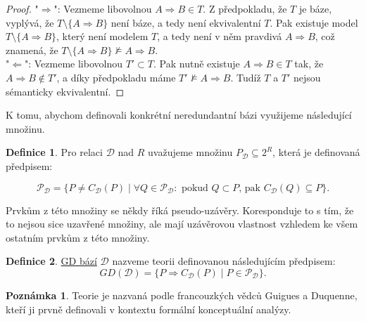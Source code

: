 \documentclass{article}
\theoremstyle {definition}
\newtheorem{definition}{Definice}
\newtheorem*{remark}{Poznámka}
\begin{document}
\begin{proof}
  "$\Rightarrow$": Vezmeme libovolnou $A \Rightarrow B \in T$. Z
  předpokladu, že $T$ je báze, vyplývá, že $T \setminus \{A
  \Rightarrow B \}$ není báze, a tedy není ekvivalentní $T$. Pak
  existuje model $T \setminus \{A \Rightarrow B \}$, který není
  modelem $T$, a tedy není v něm pravdivá $A\Rightarrow B$, což
  znamená, že $T \setminus \{A \Rightarrow B \} \not\models A
  \Rightarrow B$.\\
  
  "$\Leftarrow$": Vezmeme libovolnou $T' \subset T$. Pak nutně
  existuje $A \Rightarrow B \in T$ tak, že $A \Rightarrow B \notin
  T'$, a díky předpokladu máme $T' \not\models A \Rightarrow B$. Tudíž
  $T$ a $T'$ nejsou sémanticky ekvivalentní.
\end{proof}

K tomu, abychom definovali konkrétní neredundantní bázi využijeme
následující množinu.

\begin{definition}
  Pro relaci $\mathcal{D}$ nad $R$ uvažujeme množinu $P_{\mathcal{D}}
  \subseteq 2^R$, která je definovaná předpisem:
  
  $$ \mathcal P_{\mathcal{D}} = \{ P \neq C_{\mathcal{D}}(P) \mid
  \forall Q \in \mathcal P_{\mathcal{D}}: \text{ pokud } Q \subset P
  \text{, pak } C_{\mathcal{D}}(Q) \subseteq P \}. $$
\end{definition}

Prvkům z této množiny se někdy říká pseudo-uzávěry. Koresponduje to s
tím, že to nejsou sice uzavřené množiny, ale mají uzávěrovou vlastnost
vzhledem ke všem ostatním prvkům z této množiny.

\begin {definition}
  \underline {GD bází} $\mathcal D$ nazveme teorii definovanou
  následujícím předpisem:
  $$GD(\mathcal D)= \{P \Rightarrow C_{\mathcal{D}}(P) \mid P \in
  \mathcal P_{\mathcal{D}}\}.$$
\end {definition}

\begin {remark}
  Teorie je nazvaná podle francouzkých vědců Guigues a Duquenne, kteří
  ji prvně definovali v kontextu formální konceptuální analýzy.
\end {remark}
\end{document}
